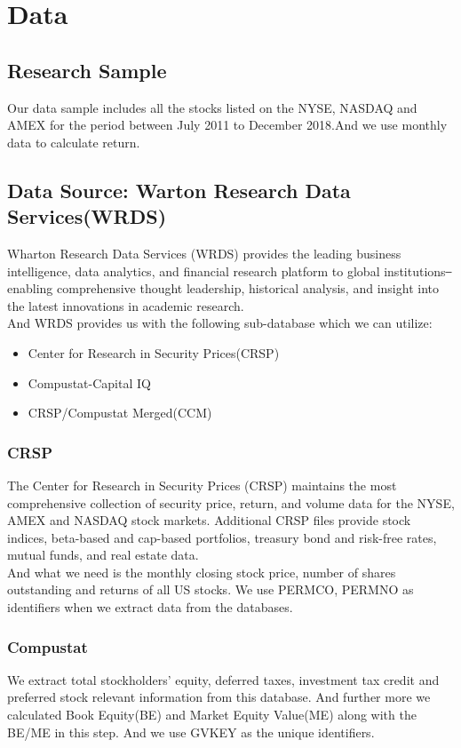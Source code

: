 \documentclass[12pt]{article}
\begin{document}
		
\section{Data}
\subsection{Research Sample}
\noindent Our data sample includes all the stocks listed on the NYSE, NASDAQ and AMEX for the period between July 2011 to December 2018.And we use monthly data to calculate return.
\subsection{Data Source: Warton Research Data Services(WRDS)}
Wharton Research Data Services (WRDS) provides the leading business intelligence, data analytics, and financial research platform to global institutions ̶ enabling comprehensive thought leadership, historical analysis, and insight into the latest innovations in academic research.\\
And WRDS provides us with the following sub-database which we can utilize:
\begin{itemize}
	\item Center for Research in Security Prices(CRSP)
	\item Compustat-Capital IQ
	\item CRSP/Compustat Merged(CCM)
\end{itemize}
\subsubsection{CRSP}
\noindent The Center for Research in Security Prices (CRSP) maintains the most comprehensive collection of security price, return, and volume data for the NYSE, AMEX and NASDAQ stock markets. Additional CRSP files provide stock indices, beta-based and cap-based portfolios, treasury bond and risk-free rates, mutual funds, and real estate data.\\

\noindent And what we need is the monthly closing stock price, number of shares outstanding and returns of all US stocks. We use PERMCO, PERMNO as identifiers when we extract data from the databases.
\subsubsection{Compustat}
\noindent We extract total stockholders' equity, deferred taxes, investment tax credit and preferred stock relevant information from this database. And further more we calculated Book Equity(BE) and Market Equity Value(ME) along with the BE/ME in this step. And we use GVKEY as the unique identifiers.
\end{document}
